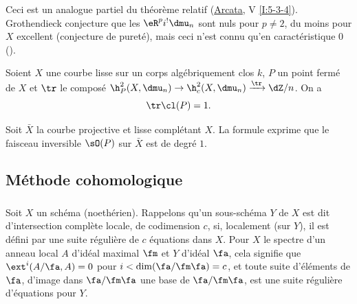 Ceci est un analogue partiel du théorème relatif 
(\hyperref[I]{Arcata}, V \ref{I:5-3-4}). Grothendieck conjecture 
que les $\eR^p i^! \dmu_n$ sont nuls pour $p\ne 2$, du moins pour $X$ excellent 
(conjecture de pureté), mais ceci n'est connu qu'en caractéristique $0$ 
(). 




\begin{theorem}\label{IV:2-1-5}
Soient $X$ une courbe lisse sur un corps algébriquement clos $k$, $P$ un 
point fermé de $X$ et $\tr$ le composé $\h_P^2(X,\dmu_n) \to \h_c^2(X,\dmu_n) \xrightarrow{\tr} \dZ/n$. On a 
\[
  \tr \cl(P) = 1 \text{.}
\]
\end{theorem}

Soit $\bar X$ la courbe projective et lisse complétant $X$. La formule 
exprime que le faisceau inversible $\sO(P)$ sur $\bar X$ est de degré $1$. 










\subsection{Méthode cohomologique}\label{IV:2-2}





\subsubsection{}\label{IV:2-2-1}

Soit $X$ un schéma (noethérien). Rappelons qu'un sous-schéma $Y$ de $X$ 
est dit d'intersection complète locale, de codimension $c$, si, localement 
(sur $Y$), il est défini par une suite régulière de $c$ équations dans 
$X$. Pour $X$ le spectre d'un anneau local $A$ d'idéal maximal $\fm$ et 
$Y$ d'idéal $\fa$, cela signifie que $\ext^i(A/\fa,A) = 0$ pour 
$i<\dim(\fa/\fm\fa)=c$, et toute suite d'éléments de $\fa$, d'image dans 
$\fa/\fm\fa$ une base de $\fa/\fm\fa$, est une suite régulière 
d'équations pour $Y$. 





\subsubsection{}\label{IV:2-2-2}

